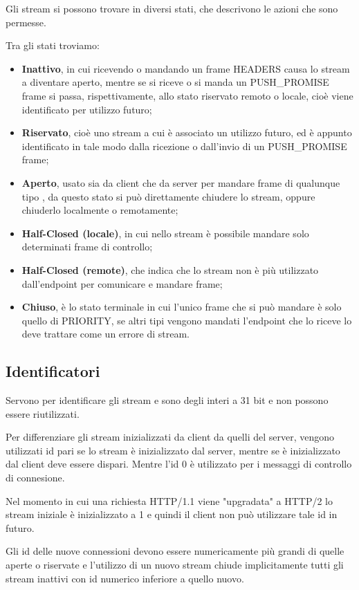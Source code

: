 \documentclass[12pt, a4paper]{article} %
\begin{document}
Gli stream si possono trovare in diversi stati, che descrivono le azioni che sono permesse.

Tra gli stati troviamo:

\begin{itemize}
  \item \textbf{Inattivo}, in cui ricevendo o mandando un frame HEADERS causa lo stream a diventare aperto, mentre se si riceve o si manda un PUSH\_PROMISE frame si passa, rispettivamente, allo stato riservato remoto o locale, cioè viene identificato per utilizzo futuro;
  \item \textbf{Riservato}, cioè uno stream a cui è associato un utilizzo futuro, ed è appunto identificato in tale modo dalla ricezione o dall'invio di un PUSH\_PROMISE frame;
  \item \textbf{Aperto}, usato sia da client che da server per mandare frame di qualunque tipo , da questo stato si può direttamente chiudere lo stream, oppure chiuderlo localmente o remotamente;
  \item \textbf{Half-Closed (locale)}, in cui nello stream è possibile mandare solo determinati frame di controllo;
  \item \textbf{Half-Closed (remote)}, che indica che lo stream non è più utilizzato dall'endpoint per comunicare e mandare frame;
  \item \textbf{Chiuso}, è lo stato terminale in cui l'unico frame che si può mandare è solo quello di PRIORITY, se altri tipi vengono mandati l'endpoint che lo riceve lo deve trattare come un errore di stream.
\end{itemize}

\subsection{Identificatori}
Servono per identificare gli stream e sono degli interi a 31 bit e non possono essere riutilizzati.

Per differenziare gli stream inizializzati da client da quelli del server, vengono utilizzati id pari se lo stream è inizializzato dal server, mentre se è inizializzato dal client deve essere dispari.
Mentre l'id 0 è utilizzato per i messaggi di controllo di connesione.

Nel momento in cui una richiesta HTTP/1.1 viene "upgradata" a HTTP/2 lo stream iniziale è inizializzato a 1 e quindi il client non può utilizzare tale id in futuro.

Gli id delle nuove connessioni devono essere numericamente più grandi di quelle aperte o riservate e l'utilizzo di un nuovo stream chiude implicitamente tutti gli stream inattivi con id numerico inferiore a quello nuovo.
\end{document}
